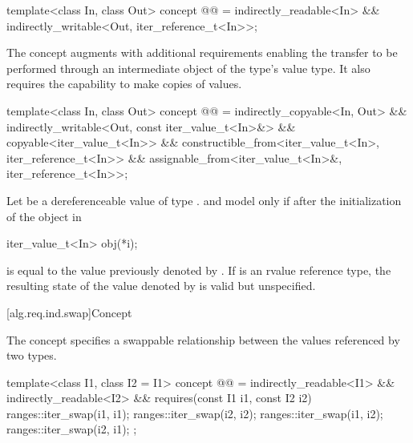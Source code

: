 \begin{codeblock}
template<class In, class Out>
  concept @@ =
    indirectly_readable<In> &&
    indirectly_writable<Out, iter_reference_t<In>>;
\end{codeblock}

\pnum
The  concept augments
 with additional requirements enabling
the transfer to be performed through an intermediate object of the
 type's value type. It also requires the capability
to make copies of values.

\begin{codeblock}
template<class In, class Out>
  concept @@ =
    indirectly_copyable<In, Out> &&
    indirectly_writable<Out, const iter_value_t<In>&> &&
    copyable<iter_value_t<In>> &&
    constructible_from<iter_value_t<In>, iter_reference_t<In>> &&
    assignable_from<iter_value_t<In>&, iter_reference_t<In>>;
\end{codeblock}

\pnum
Let  be a dereferenceable value of type .
 and  model 
only if after the initialization of the object  in
\begin{codeblock}
iter_value_t<In> obj(*i);
\end{codeblock}
 is equal to the value previously denoted by . If
 is an rvalue reference type, the resulting state
of the value denoted by  is
valid but unspecified.

[alg.req.ind.swap]{Concept }

\pnum
The  concept specifies a swappable relationship
between the values referenced by two  types.

\begin{codeblock}
template<class I1, class I2 = I1>
  concept @@ =
    indirectly_readable<I1> && indirectly_readable<I2> &&
    requires(const I1 i1, const I2 i2) {
      ranges::iter_swap(i1, i1);
      ranges::iter_swap(i2, i2);
      ranges::iter_swap(i1, i2);
      ranges::iter_swap(i2, i1);
    };
\end{codeblock}

